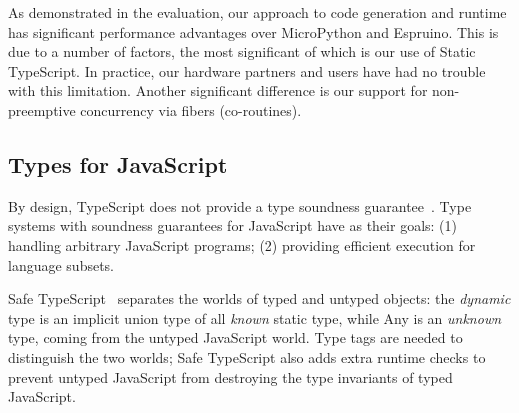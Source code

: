As demonstrated in the evaluation, our approach to code generation and runtime
has significant performance advantages over MicroPython and Espruino.
This is due to a number of factors, the most significant of which is our use of
Static TypeScript. In practice, our hardware partners and users have had no
trouble with this limitation.  Another significant difference is our support
for non-preemptive concurrency via fibers (co-routines). 











\subsection{Types for JavaScript}

By design, TypeScript does not provide a type soundness guarantee~\cite{BiermanAT14}.
Type systems with soundness guarantees for JavaScript have as their
goals: (1) handling arbitrary JavaScript programs; 
(2) providing efficient execution for language subsets.

Safe TypeScript~\cite{SafeTypeScript15} separates the worlds of typed and untyped 
objects: the \emph{dynamic} type is an implicit union type of all \emph{known} static type, 
while Any is an \emph{unknown} type, coming from the untyped JavaScript world. Type tags 
are needed to distinguish the two worlds; Safe TypeScript also adds extra runtime checks
to prevent untyped JavaScript from destroying the type invariants of typed JavaScript.  


